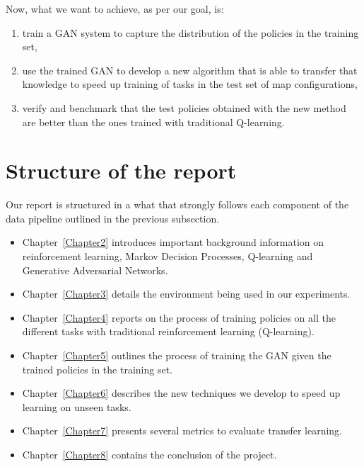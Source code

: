 Now, what we want to achieve, as per our goal, is:
\begin{enumerate}
	\item train a GAN system to capture the distribution of the policies in the training set,
	\item use the trained GAN to develop a new algorithm that is able to transfer that knowledge to speed up training of tasks in the test set of map configurations,
	\item verify and benchmark that the test policies obtained with the new method are better than the ones trained with traditional Q-learning.
\end{enumerate}


\section{Structure of the report}
Our report is structured in a what that strongly follows each component of the data pipeline outlined in the previous subsection.
\begin{itemize}
	\item Chapter~\ref{Chapter2} introduces important background information on reinforcement learning, Markov Decision Processes, Q-learning and Generative Adversarial Networks.
	\item Chapter~\ref{Chapter3} details the environment being used in our experiments.
	\item Chapter~\ref{Chapter4} reports on the process of training policies on all the different tasks with traditional reinforcement learning (Q-learning).
	\item Chapter~\ref{Chapter5} outlines the process of training the GAN given the trained policies in the training set.
	\item Chapter~\ref{Chapter6} describes the new techniques we develop to speed up learning on unseen tasks.
	\item Chapter~\ref{Chapter7} presents several metrics to evaluate transfer learning.
	\item Chapter~\ref{Chapter8} contains the conclusion of the project.
\end{itemize}


